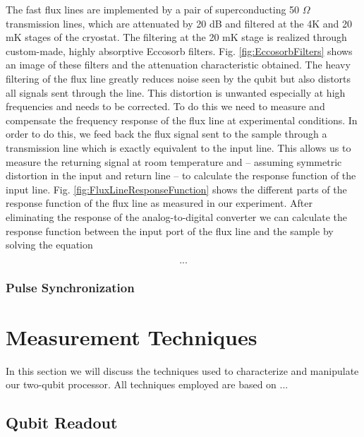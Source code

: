 The fast flux lines are implemented by a pair of superconducting 50 $\Omega$ transmission lines, which are attenuated by 20 dB and filtered at the 4K and 20 mK stages of the cryostat. The filtering at the 20 mK stage is realized through custom-made, highly absorptive Eccosorb filters. Fig. \ref{fig:EccosorbFilters} shows an image of these filters and the attenuation characteristic obtained. The heavy filtering of the flux line greatly reduces noise seen by the qubit but also distorts all signals sent through the line. This distortion is unwanted especially at high frequencies and needs to be corrected. To do this we need to measure and compensate the frequency response of the flux line at experimental conditions. In order to do this, we feed back the flux signal sent to the sample through a transmission line which is exactly equivalent to the input line. This allows us to measure the returning signal at room temperature and -- assuming symmetric distortion in the input and return line -- to calculate the response function of the input line. Fig. \ref{fig:FluxLineResponseFunction} shows the different parts of the response function of the flux line as measured in our experiment. After eliminating the response of the analog-to-digital converter we can calculate the response function between the input port of the flux line and the sample by solving the equation

\begin{equation}
...
\end{equation}

\subsection{Pulse Synchronization}

\chapter{Measurement Techniques}

In this section we will discuss the techniques used to characterize and manipulate our two-qubit processor. All techniques employed are based on ...

\section{Qubit Readout}

